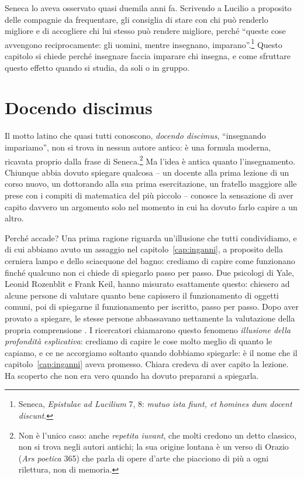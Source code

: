 Seneca lo aveva osservato quasi duemila anni fa. Scrivendo a Lucilio a
proposito delle compagnie da frequentare, gli consiglia di stare con chi
può renderlo migliore e di accogliere chi lui stesso può rendere
migliore, perché \enquote{queste cose avvengono reciprocamente: gli
uomini, mentre insegnano, imparano}.\footnote{Seneca, \emph{Epistulae
ad Lucilium} 7, 8: \emph{mutuo ista fiunt, et homines dum docent
discunt}.} Questo capitolo si chiede perché insegnare faccia imparare
chi insegna, e come sfruttare questo effetto quando si studia, da soli
o in gruppo.

\section{Docendo discimus}

Il motto latino che quasi tutti conoscono, \emph{docendo discimus},
\enquote{insegnando impariamo}, non si trova in nessun autore antico:
è una formula moderna, ricavata proprio dalla frase di
Seneca.\footnote{Non è l'unico caso: anche \emph{repetita iuvant}, che
molti credono un detto classico, non si trova negli autori antichi; la
sua origine lontana è un verso di Orazio (\emph{Ars poetica} 365) che
parla di opere d'arte che piacciono di più a ogni rilettura, non di
memoria.} Ma l'idea è antica quanto l'insegnamento. Chiunque abbia
dovuto spiegare qualcosa -- un docente alla prima lezione di un corso
nuovo, un dottorando alla sua prima esercitazione, un fratello maggiore
alle prese con i compiti di matematica del più piccolo -- conosce la
sensazione di aver capito davvero un argomento solo nel momento in cui
ha dovuto farlo capire a un altro.

Perché accade? Una prima ragione riguarda un'illusione che tutti
condividiamo, e di cui abbiamo avuto un assaggio nel
capitolo~\ref{cap:inganni}, a proposito della cerniera lampo e dello
sciacquone del bagno: crediamo di capire come funzionano finché
qualcuno non ci chiede di spiegarlo passo per passo. Due psicologi di
Yale, Leonid Rozenblit e Frank Keil, hanno misurato esattamente questo:
chiesero ad alcune persone di valutare quanto bene capissero il
funzionamento di oggetti comuni, poi di spiegarne il funzionamento per
iscritto, passo per passo. Dopo aver provato a spiegare, le stesse
persone abbassavano nettamente la valutazione della propria
comprensione \parencite{rozenblit2002}. I ricercatori chiamarono questo
fenomeno \emph{illusione della profondità esplicativa}: crediamo di
capire le cose molto meglio di quanto le capiamo, e ce ne accorgiamo
soltanto quando dobbiamo spiegarle: è il nome che il
capitolo~\ref{cap:inganni} aveva promesso. Chiara credeva di aver capito
la lezione. Ha scoperto che non era vero quando ha dovuto prepararsi a
spiegarla.

